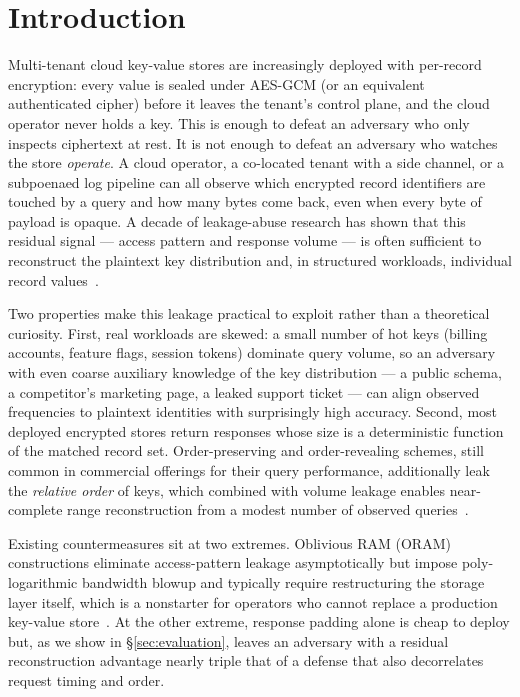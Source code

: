 \section{Introduction}
\label{sec:introduction}

Multi-tenant cloud key-value stores are increasingly deployed with
per-record encryption: every value is sealed under AES-GCM (or an
equivalent authenticated cipher) before it leaves the tenant's control
plane, and the cloud operator never holds a key. This is enough to defeat
an adversary who only inspects ciphertext at rest. It is not enough to
defeat an adversary who watches the store \emph{operate}. A cloud operator,
a co-located tenant with a side channel, or a subpoenaed log pipeline can
all observe which encrypted record identifiers are touched by a query and
how many bytes come back, even when every byte of payload is opaque. A
decade of leakage-abuse research has shown that this residual signal ---
access pattern and response volume --- is often sufficient to reconstruct
the plaintext key distribution and, in structured workloads, individual
record values~\cite{islam2012access,kellaris2016generic,grubbs2018pumpup}.

Two properties make this leakage practical to exploit rather than a
theoretical curiosity. First, real workloads are skewed: a small number of
hot keys (billing accounts, feature flags, session tokens) dominate query
volume, so an adversary with even coarse auxiliary knowledge of the key
distribution --- a public schema, a competitor's marketing page, a leaked
support ticket --- can align observed frequencies to plaintext identities
with surprisingly high accuracy. Second, most deployed encrypted stores
return responses whose size is a deterministic function of the matched
record set. Order-preserving and order-revealing schemes, still common in
commercial offerings for their query performance, additionally leak the
\emph{relative order} of keys, which combined with volume leakage enables
near-complete range reconstruction from a modest number of observed
queries~\cite{grubbs2018pumpup,kellaris2016generic}.

Existing countermeasures sit at two extremes. Oblivious RAM (ORAM)
constructions eliminate access-pattern leakage asymptotically but impose
poly-logarithmic bandwidth blowup and typically require restructuring the
storage layer itself, which is a nonstarter for operators who cannot
replace a production key-value store~\cite{stefanov2018path}. At the other
extreme, response padding alone is cheap to deploy but, as we show in
\S\ref{sec:evaluation}, leaves an adversary with a residual reconstruction
advantage nearly triple that of a defense that also decorrelates request
timing and order.

